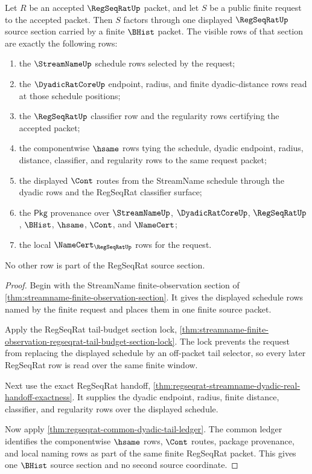 \begin{theorem}
\label{thm:regseqrat-finite-request-source-section}
Let $R$ be an accepted $\RegSeqRatUp$ packet, and let $S$ be a public finite
request to the accepted packet. Then $S$ factors through one displayed
$\RegSeqRatUp$ source section carried by a finite $\BHist$ packet. The visible
rows of that section are exactly the following rows:
\begin{enumerate}
\item the $\StreamNameUp$ schedule rows selected by the request;
\item the $\DyadicRatCoreUp$ endpoint, radius, and finite dyadic-distance rows
read at those schedule positions;
\item the $\RegSeqRatUp$ classifier row and the regularity rows certifying the
accepted packet;
\item the componentwise $\hsame$ rows tying the schedule, dyadic endpoint,
radius, distance, classifier, and regularity rows to the same request packet;
\item the displayed $\Cont$ routes from the StreamName schedule through the
dyadic rows and the RegSeqRat classifier surface;
\item the $\mathsf{Pkg}$ provenance over $\StreamNameUp$, $\DyadicRatCoreUp$,
$\RegSeqRatUp$, $\BHist$, $\hsame$, $\Cont$, and $\NameCert$;
\item the local $\NameCert_{\RegSeqRatUp}$ rows for the request.
\end{enumerate}
No other row is part of the RegSeqRat source section.
\end{theorem}
\begin{proof}
Begin with the StreamName finite-observation section of
\autoref{thm:streamname-finite-observation-section}. It gives the displayed
schedule rows named by the finite request and places them in one finite source
packet.

Apply the RegSeqRat tail-budget section lock,
\autoref{thm:streamname-finite-observation-regseqrat-tail-budget-section-lock}.
The lock prevents the request from replacing the displayed schedule by an
off-packet tail selector, so every later RegSeqRat row is read over the same
finite window.

Next use the exact RegSeqRat handoff,
\autoref{thm:regseqrat-streamname-dyadic-real-handoff-exactness}. It supplies
the dyadic endpoint, radius, finite distance, classifier, and regularity rows
over the displayed schedule.

Now apply \autoref{thm:regseqrat-common-dyadic-tail-ledger}. The common ledger
identifies the componentwise $\hsame$ rows, $\Cont$ routes, package
provenance, and local naming rows as part of the same finite RegSeqRat packet.
This gives one $\BHist$ source section and no second source coordinate.
\end{proof}

